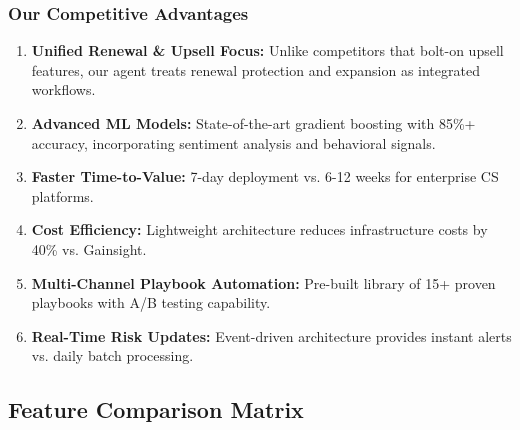 \documentclass[12pt,a4paper]{article}
\begin{document}
\subsubsection{Our Competitive Advantages}
\begin{enumerate}
    \item \textbf{Unified Renewal \& Upsell Focus:} Unlike competitors that bolt-on upsell features, our agent treats renewal protection and expansion as integrated workflows.
    \item \textbf{Advanced ML Models:} State-of-the-art gradient boosting with 85\%+ accuracy, incorporating sentiment analysis and behavioral signals.
    \item \textbf{Faster Time-to-Value:} 7-day deployment vs. 6-12 weeks for enterprise CS platforms.
    \item \textbf{Cost Efficiency:} Lightweight architecture reduces infrastructure costs by 40\% vs. Gainsight.
    \item \textbf{Multi-Channel Playbook Automation:} Pre-built library of 15+ proven playbooks with A/B testing capability.
    \item \textbf{Real-Time Risk Updates:} Event-driven architecture provides instant alerts vs. daily batch processing.
\end{enumerate}

\subsection{Feature Comparison Matrix}

\footnotesize
\setlength{\tabcolsep}{2pt}
\renewcommand{\arraystretch}{1.2}
\end{document}
